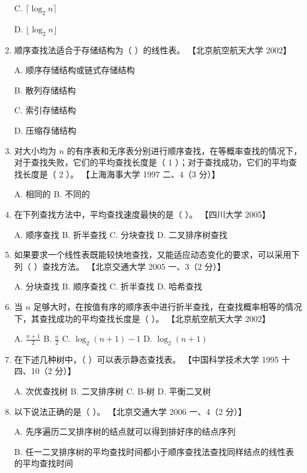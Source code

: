 \documentclass[lang=cn,newtx,10pt,scheme=chinese]{elegantbook}
\begin{document}
\begin{enumerate}
    C. $\lceil \log_2 n \rceil$  

    D. $\lfloor \log_2 n \rfloor$  

    \item 顺序查找法适合于存储结构为（ ）的线性表。  
    【北京航空航天大学 2002】  

    A. 顺序存储结构或链式存储结构 

    B. 散列存储结构  

    C. 索引存储结构  


    D. 压缩存储结构  

    \item 对大小均为 $n$ 的有序表和无序表分别进行顺序查找，在等概率查找的情况下，对于查找失败，它们的平均查找长度是（ 1 ）；对于查找成功，它们的平均查找长度是（ 2 ）。  
    【上海海事大学 1997 二、4（3 分）】  

    A. 相同的 \quad B. 不同的  

    \item 在下列查找方法中，平均查找速度最快的是（ ）。  
    【四川大学 2005】  

    A. 顺序查找 \quad B. 折半查找 \quad C. 分块查找 \quad D. 二叉排序树查找  

    \item 如果要求一个线性表既能较快地查找，又能适应动态变化的要求，可以采用下列（ ）查找方法。  
    【北京交通大学 2005 一、3（2 分）】  

    A. 分块查找 \quad B. 顺序查找 \quad C. 折半查找 \quad D. 哈希查找  

    \item 当 $n$ 足够大时，在按值有序的顺序表中进行折半查找，在查找概率相等的情况下，其查找成功的平均查找长度是（ ）。  
    【北京航空航天大学 2002】  

    A. $\frac{n+1}{2}$ \quad B. $\frac{n}{2}$ \quad C. $\log_2(n+1) - 1$ \quad D. $\log_2(n+1)$  

    \item 在下述几种树中，（ ）可以表示静态查找表。  
    【中国科学技术大学 1995 十四、10（2 分）】  

    A. 次优查找树 \quad B. 二叉排序树 \quad C. B-树 \quad D. 平衡二叉树  

    \item 以下说法正确的是（ ）。  
    【北京交通大学 2006 一、4（2 分）】  

    A. 先序遍历二叉排序树的结点就可以得到排好序的结点序列 

    B. 任一二叉排序树的平均查找时间都小于顺序查找法查找同样结点的线性表的平均查找时间  


\end{enumerate}
\end{document}
